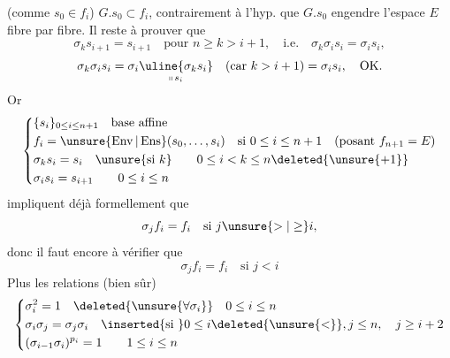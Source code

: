 (comme $s_0\in f_i$) $G.s_0\subset f_i$, contrairement à l'hyp. que  $G.s_0$ engendre l'espace  $E$ fibre par fibre. Il reste à prouver que
\[
\sigma_k s_{i+1}=s_{i+1}\quad\text{pour }n\geq k>i+1,\quad\text{i.e.}\quad\sigma_k\sigma_i s_i=\sigma_i s_i,
\]
\[
\sigma_k\sigma_i s_i=\sigma_i\underset{\shortparallel\,s_i}{\uline{\sigma_k s_i}}\quad(\text{car }k>i+1)=\sigma_i s_i,\quad\text{OK.}
\]
Or
\[
\left\{\begin{aligned}
&\{s_i\}_{0\leq i\leq n+1}\quad\text{base affine}\\
&f_i=\unsure{\operatorname{Env}|\operatorname{Ens}}(s_0,\ldots,s_i)\quad\text{si }0\leq i\leq n+1\quad(\text{posant }f_{n+1}=E)\\
&\sigma_k s_i=s_i\quad\unsure{\text{si }k}\qquad0\leq i<k\leq n\deleted{\unsure{+1}}\\
&\sigma_i s_i=s_{i+1}\qquad0\leq i\leq n
\end{aligned}\right.
\]
impliquent déjà  formellement que
\[
\sigma_j f_i=f_i\quad\text{si }j\unsure{>|\geq}i,
\]
donc il faut encore à vérifier que 
\[
\sigma_j f_i=f_i\quad\text{si }j<i
\]
 Plus les relations (bien sûr)
\[
\left\{\begin{aligned}
&\sigma_i^2=1\quad\deleted{\unsure{\forall\sigma_i}}\quad0\leq i\leq n\\
&\sigma_i\sigma_j=\sigma_j\sigma_i\quad\inserted{\text{si }}0\leq i\deleted{\unsure{<}},j\leq n,\quad j\geq i+2\\
&(\sigma_{i-1}\sigma_i)^{p_i}=1\qquad1\leq i\leq n
\end{aligned}\right.
\]
